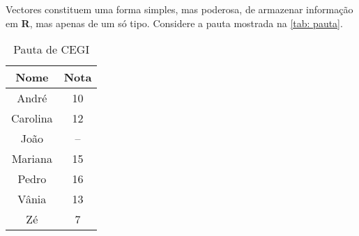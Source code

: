 \documentclass{exam}
\begin{document}
Vectores constituem uma forma simples, mas poderosa, de armazenar informação em \textbf{R}, mas apenas de um só tipo. Considere a pauta mostrada na \autoref{tab: pauta}.
\begin{table}[htdp]
\caption{Pauta de CEGI}
\label{tab: pauta}
\begin{center}
\begin{tabular}{|c|c|}
\hline
Nome & Nota \\ \hline
André & 10 \\
Carolina & 12 \\
João & -- \\
Mariana & 15 \\
Pedro & 16 \\
Vânia & 13 \\
Zé & 7 \\
\hline
\end{tabular}
\end{center}
\label{pauta}
\end{table}
\end{document}

